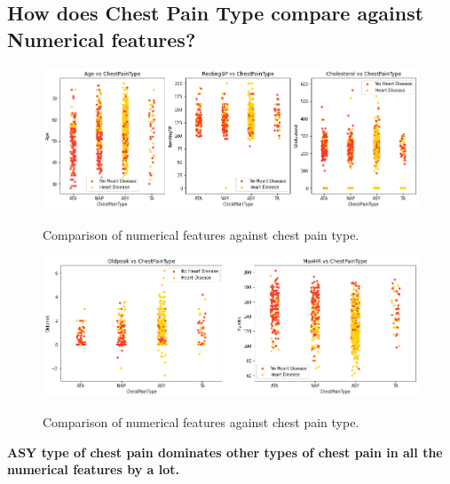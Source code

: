 \subsection{How does Chest Pain Type compare against Numerical features?}
\begin{figure}[!htpb]
    \centering
    \includegraphics[width=0.7\linewidth]{Figures/Outputs/ches-num.png}
    \label{Comparison between numerical features against chest pain type}
    \caption{Comparison of numerical features against chest pain type.}
\end{figure}
\begin{figure}[!htpb]
    \centering
    \includegraphics[width=0.7\linewidth]{Figures/Outputs/ches-num2.png}
    \label{Comparison between numerical features against chest pain type.}
    \caption{Comparison of numerical features against chest pain type.}
\end{figure}
\textbf{ASY type of chest pain dominates other types of chest pain in all the numerical features by a lot.}

